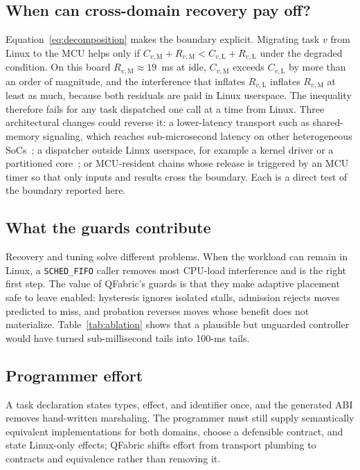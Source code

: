 \documentclass[conference]{IEEEtran}
\newcommand{\system}{QFabric\xspace}
\begin{document}
\subsection{When can cross-domain recovery pay off?}
Equation~\eqref{eq:decomposition} makes the boundary explicit. Migrating task
$v$ from Linux to the MCU helps only if
$C_{v,\mathrm{M}}+R_{v,\mathrm{M}} < C_{v,\mathrm{L}}+R_{v,\mathrm{L}}$ under
the degraded condition. On this board $R_{v,\mathrm{M}}\approx19$~ms at idle,
$C_{v,\mathrm{M}}$ exceeds $C_{v,\mathrm{L}}$ by more than an order of
magnitude, and the interference that inflates $R_{v,\mathrm{L}}$ inflates
$R_{v,\mathrm{M}}$ at least as much, because both residuals are paid in Linux
userspace. The inequality therefore fails for any task dispatched one call at
a time from Linux. Three architectural changes could reverse it: a
lower-latency transport such as shared-memory signaling, which reaches
sub-microsecond latency on other heterogeneous SoCs~\cite{coppik2025lowlatency};
a dispatcher outside Linux userspace, for example a kernel driver or a
partitioned core~\cite{martins2023partitioning}; or MCU-resident chains whose
release is triggered by an MCU timer so that only inputs and results cross
the boundary. Each is a direct test of the boundary reported here.

\subsection{What the guards contribute}
Recovery and tuning solve different problems. When the workload can remain in
Linux, a \texttt{SCHED\_FIFO} caller removes most CPU-load interference and is
the right first step. The value of \system's guards is that they make
adaptive placement safe to leave enabled: hysteresis ignores isolated stalls,
admission rejects moves predicted to miss, and probation reverses moves whose
benefit does not materialize. Table~\ref{tab:ablation} shows that a plausible
but unguarded controller would have turned sub-millisecond tails into
100-ms tails.

\subsection{Programmer effort}
A task declaration states types, effect, and identifier once, and the
generated ABI removes hand-written marshaling. The programmer must still
supply semantically equivalent implementations for both domains, choose a
defensible contract, and state Linux-only effects; \system shifts effort from
transport plumbing to contracts and equivalence rather than removing it.
\end{document}
